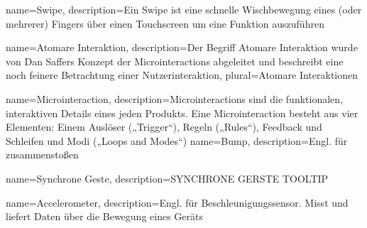 {
    name=Swipe,
    description={Ein Swipe ist eine schnelle Wischbewegung eines (oder 				mehrerer) Fingers über einen Touchscreen um eine Funktion auszuführen}
}

{
    name=Atomare Interaktion,
    description={Der Begriff Atomare Interaktion wurde von Dan Saffers Konzept 		der Microinteractions abgeleitet und beschreibt eine noch feinere 				Betrachtung einer Nutzerinteraktion},
    plural={Atomare Interaktionen}
}

{
    name=Microinteraction,
    description={Microinteractions sind die funktionalen, interaktiven Details 		eines jeden Produkts. Eine Microinteraction besteht aus vier Elementen: 		Einem Auslöser („Trigger“), Regeln („Rules“), Feedback und Schleifen und 		Modi („Loops and Modes“)}
}
{
	name=Bump,
	description={Engl. für zusammenstoßen}
}

{
	name=Synchrone Geste,
	description={SYNCHRONE GERSTE TOOLTIP}
}

{
	name=Accelerometer,
	description={Engl. für Beschleunigungssensor. Misst und liefert Daten 			über die Bewegung eines Geräts}
}